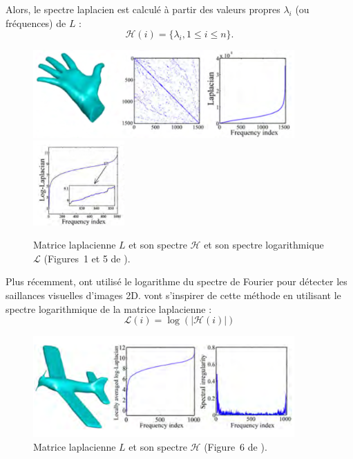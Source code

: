 Alors, le spectre laplacien est calculé à partir des valeurs propres $\lambda_i$
(ou fréquences) de $L$ :
%
\begin{equation}
  \mathcal{H}(i) = \{ \lambda_i, 1 \le i \le n \}.
\end{equation}
%
\begin{figure}[ht]{
    \begin{center}
    \includegraphics[width=10cm]{images/Feature/LaplacianSpectrum}
    \includegraphics[width=3.5cm]{images/Feature/LaplacianSpectrumLog}
    \end{center}}
    \caption[Matrice laplacienne et son spectre.]{Matrice laplacienne $L$ et son spectre $\mathcal{H}$ et son spectre logarithmique $\mathcal{L}$ (Figures~1 et 5 de \cite{Song2014}).
      \label{fig:laplacian-spectrum}}
\end{figure}
%
Plus récemment,  ont utilisé le logarithme du spectre de
Fourier pour détecter les saillances visuelles d'images 2D.  vont
s'inspirer de cette méthode en utilisant le spectre logarithmique de la matrice
laplacienne :
%
\begin{equation}
  \mathcal{L}(i) = \log(|\mathcal{H}(i)|)
\end{equation}
%
%
\begin{figure}[ht]{
    \begin{center}
    \includegraphics[width=10cm]{images/Feature/LaplacianSpectrumLogAvg}
    \end{center}}
    \caption[Matrice laplacienne et son spectre.]{Matrice laplacienne $L$ et son spectre $\mathcal{H}$ (Figure~6 de \cite{Song2014}).
      \label{fig:laplacian-spectrum-avg}}
\end{figure}


